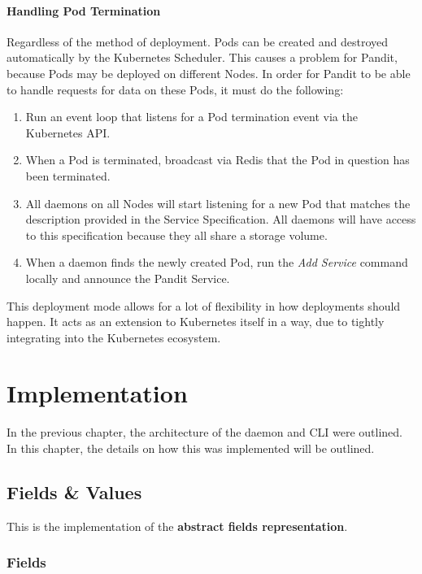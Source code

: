 \documentclass[a4paper,12pt]{report}
\begin{document}
\subsubsection{Handling Pod Termination}
Regardless of the method of deployment. Pods can be created and destroyed automatically by the Kubernetes Scheduler.
This causes a problem for Pandit, because Pods may be deployed on different Nodes. In order for Pandit to be able to handle requests for data on these Pods,
it must do the following:

\begin{enumerate}
    \item Run an event loop that listens for a Pod termination event via the Kubernetes API.
    \item When a Pod is terminated, broadcast via Redis that the Pod in question has been terminated.
    \item All daemons on all Nodes will start listening for a new Pod that matches the description provided in the Service Specification. All daemons will have access to this specification because they all share a storage volume.
    \item When a daemon finds the newly created Pod, run the \textit{Add Service} command locally and announce the Pandit Service.
\end{enumerate}

This deployment mode allows for a lot of flexibility in how deployments should happen. It acts as an extension to Kubernetes itself in a way, due to tightly integrating into the Kubernetes ecosystem.

\chapter{Implementation}

In the previous chapter, the architecture of the daemon and CLI were outlined. In this chapter, the details on how this was implemented will be outlined.
\section{Fields \& Values}
\label{sec:fv}

This is the implementation of the \textbf{abstract fields representation}.

\subsection{Fields}
\end{document}
